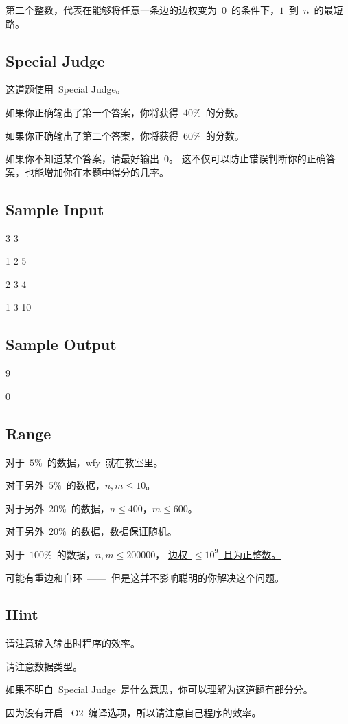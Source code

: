\documentclass[12pt, hyperref, UTF8]{article}
\begin{document}
	第二个整数，代表在能够将任意一条边的边权变为~$0$~的条件下，$1$~到~$n$~的最短路。

	\subsection{Special Judge}
	这道题使用~Special Judge。
	
	如果你正确输出了第一个答案，你将获得~$40\%$~的分数。

	如果你正确输出了第二个答案，你将获得~$60\%$~的分数。

	如果你不知道某个答案，请最好输出~$0$。
	这不仅可以防止错误判断你的正确答案，也能增加你在本题中得分的几率。

	\newpage
	\subsection{Sample Input}
	3 3
	
	1 2 5
	
	2 3 4
	
	1 3 10

	\subsection{Sample Output}
	9

	0

	\subsection{Range}
	对于~$5\%$~的数据，wfy~就在教室里。
	
	对于另外~$5\%$~的数据，$n, m \le 10$。

	对于另外~$20\%$~的数据，$n \le 400$，$m \le 600$。

	对于另外~$20\%$~的数据，数据保证随机。

	对于~$100\%$~的数据，$n, m \le 200000$，
	\underline{边权~$\le 10^9$~且为正整数。}

	可能有重边和自环~——~但是这并不影响聪明的你解决这个问题。

	\subsection{Hint}
	请注意输入输出时程序的效率。

	请注意数据类型。

	如果不明白~Special Judge~是什么意思，你可以理解为这道题有部分分。

	因为没有开启~-O2~编译选项，所以请注意自己程序的效率。
\end{document}
